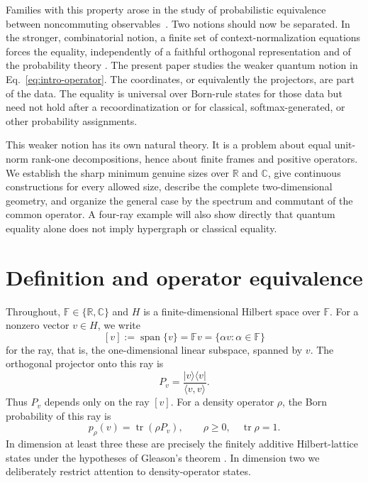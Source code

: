 \documentclass[
  twocolumn,
  aps,
  pra,
  floatfix,
  amsmath,amssymb,
  longbibliography
]{revtex4-2}
\theoremstyle{definition}
\theoremstyle{remark}
\newcommand{\R}{\mathbb R}
\newcommand{\C}{\mathbb C}
\newcommand{\F}{\mathbb F}
\newcommand{\Tr}{\operatorname{tr}}
\newcommand{\1}{\mathbf 1}
\begin{document}
Families with this property arose in the study of probabilistic equivalence
between noncommuting observables~\cite{2023-navara-svozil,NSvozil:QS24}.  Two
notions should now be separated.  In the stronger, combinatorial notion, a
finite set of context-normalization equations forces the equality,
independently of a faithful orthogonal representation and of the probability theory
\cite{2026-Navara-Svozil-pseudocontexts}.  The present paper studies
the weaker quantum notion in Eq.~\eqref{eq:intro-operator}.  The coordinates,
or equivalently the projectors, are part of the data.  The equality is
universal over Born-rule states for those data but need not hold after a
recoordinatization or for classical, softmax-generated, or other probability
assignments.

This weaker notion has its own natural theory.  It is a problem about equal
unit-norm rank-one decompositions, hence about finite frames and positive
operators.  We establish the sharp minimum genuine sizes over $\R$ and $\C$,
give continuous constructions for every allowed size, describe the complete
two-dimensional geometry, and organize the general case by the spectrum and
commutant of the common operator.  A four-ray example will also show directly
that quantum equality alone does not imply hypergraph or classical equality.

\section{Definition and operator equivalence}
\label{sec:definition}

Throughout, $\F\in\{\R,\C\}$ and $H$ is a finite-dimensional Hilbert space
over $\F$.  For a nonzero vector $v\in H$, we write
\[
 [v]:=\operatorname{span}\{v\}=\F v
     =\{\alpha v:\alpha\in\F\}
\]
for the ray, that is, the one-dimensional linear subspace, spanned by $v$.
The orthogonal projector onto this ray is
\begin{equation}
 P_v=\frac{|v\rangle\langle v|}{\langle v,v\rangle}.
 \label{eq:ray-projector}
\end{equation}
Thus $P_v$ depends only on the ray $[v]$.  For a density operator $\rho$, the Born
probability of this ray is
\begin{equation}
 p_\rho(v)=\Tr(\rho P_v),\qquad \rho\ge0,\quad\Tr\rho=1.
 \label{eq:born}
\end{equation}
In dimension at least three these are precisely the finitely additive
Hilbert-lattice states under the hypotheses of Gleason's theorem
\cite{Gleason}.  In dimension two we deliberately restrict attention to
density-operator states.
\end{document}
